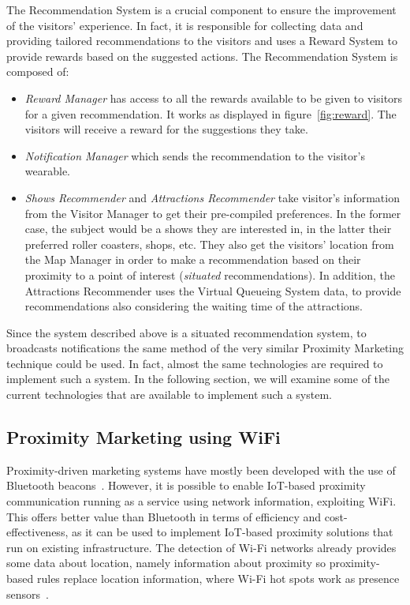 The Recommendation System is a crucial component to ensure the improvement of the visitors' experience.
In fact, it is responsible for collecting data and providing tailored recommendations to the visitors and uses a Reward System to provide rewards based on the suggested actions.
The Recommendation System is composed of:
\begin{itemize}
	\item \textit{Reward Manager} has access to all the rewards available to be given to visitors for a given recommendation. It works as displayed in figure~\ref{fig:reward}.
	The visitors will receive a reward for the suggestions they take.
	\item \textit{Notification Manager} which sends the recommendation to the visitor's wearable.
	\item \textit{Shows Recommender} and \textit{Attractions Recommender} take visitor's information from the Visitor Manager to get their pre-compiled preferences.
	In the former case, the subject would be a shows they are interested in, in the latter their preferred roller coasters, shops, etc. They also get the visitors' location from the Map Manager in order to make a recommendation based on their proximity to a point of interest (\textit{situated} recommendations).
	In addition, the Attractions Recommender uses the Virtual Queueing System data, to provide recommendations also considering the waiting time of the attractions.
\end{itemize}

Since the system described above is a situated recommendation system, to broadcasts notifications the same method of the very similar Proximity Marketing technique could be used.
In fact, almost the same technologies are required to implement such a system.
In the following section, we will examine some of the current technologies that are available to implement such a system.

\subsection{Proximity Marketing using WiFi}\label{sec:situated-recommendation-system-technologies}
Proximity-driven marketing systems have mostly been developed with the use of Bluetooth beacons~\cite{mndebele2017iot}.
However, it is possible to enable IoT-based proximity communication running as a service using network information, exploiting WiFi.
This offers better value than Bluetooth in terms of efficiency and cost-effectiveness, as it can be used to implement IoT-based proximity solutions that run on existing infrastructure.
The detection of Wi-Fi networks already provides some data about location, namely information about proximity so
proximity-based rules replace location information, where Wi-Fi hot spots work as presence sensors~\cite{dmitry2013network}.

